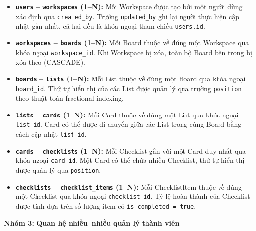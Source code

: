 \begin{itemize}
    \item \textbf{\texttt{users} -- \texttt{workspaces} (1--N):} Mỗi Workspace được tạo bởi một người dùng xác định qua \texttt{created\_by}. Trường \texttt{updated\_by} ghi lại người thực hiện cập nhật gần nhất, cả hai đều là khóa ngoại tham chiếu \texttt{users.id}.
    \item \textbf{\texttt{workspaces} -- \texttt{boards} (1--N):} Mỗi Board thuộc về đúng một Workspace qua khóa ngoại \texttt{workspace\_id}. Khi Workspace bị xóa, toàn bộ Board bên trong bị xóa theo (CASCADE).
    \item \textbf{\texttt{boards} -- \texttt{lists} (1--N):} Mỗi List thuộc về đúng một Board qua khóa ngoại \texttt{board\_id}. Thứ tự hiển thị của các List được quản lý qua trường \texttt{position} theo thuật toán fractional indexing.
    \item \textbf{\texttt{lists} -- \texttt{cards} (1--N):} Mỗi Card thuộc về đúng một List qua khóa ngoại \texttt{list\_id}. Card có thể được di chuyển giữa các List trong cùng Board bằng cách cập nhật \texttt{list\_id}.
    \item \textbf{\texttt{cards} -- \texttt{checklists} (1--N):} Mỗi Checklist gắn với một Card duy nhất qua khóa ngoại \texttt{card\_id}. Một Card có thể chứa nhiều Checklist, thứ tự hiển thị được quản lý qua \texttt{position}.
    \item \textbf{\texttt{checklists} -- \texttt{checklist\_items} (1--N):} Mỗi ChecklistItem thuộc về đúng một Checklist qua khóa ngoại \texttt{checklist\_id}. Tỷ lệ hoàn thành của Checklist được tính dựa trên số lượng item có \texttt{is\_completed = true}.
\end{itemize}

\textbf{Nhóm 3: Quan hệ nhiều--nhiều quản lý thành viên}


